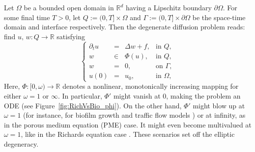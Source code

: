 \documentclass[review,11pt]{article}
\numberwithin{equation}{section}
\def \om {\omega}
\def \Om {\Omega}
\def \p  {\partial}
\def \R  {{\mathbb{R}}}
\begin{document}
Let $\Om$ be a bounded open domain in $\R^{d}$ having a Lipschitz boundary $\p\Om$. For some final time $T>0$, let $Q:=(0,T]\times\Omega$ and $\Gamma:=(0,T]\times \p\Om$ be the space-time domain and interface respectively. Then the degenerate diffusion problem reads: find $u,\,w:Q\to \R$ satisfying
\begin{equation}\label{eq:parabolic_equation}
\left\{ \begin{array}{rcll}
\partial_t u &=& \Delta w + f, & \text{in } Q, \\
w &\in& \Phi(u), & \text{in } Q, \\
w &=& 0, & \text{on } \Gamma, \\
u(0) &=& u_0, & \text{in } \Omega,
\end{array}
\right.
\end{equation}
Here, $\Phi:[0,\omega)\to \R$ denotes a nonlinear, monotonically increasing mapping for either $\omega=1$ or $\infty$. In particular, $\Phi' $ might vanish at $0$, making the problem an ODE (see Figure~\ref{fig:RichVsBio_phi}). On the other hand, $\Phi'$ might blow up at $\om=1$ (for instance, for biofilm growth \cite{van2002mathematical} and traffic flow models \cite{berthelin2008model}) or at infinity, as in the porous medium equation (PME) case. It might even become multivalued at $\om=1$, like in the Richards equation case \cite{mitra2024posteriori}. These scenarios set off the elliptic degeneracy.
\end{document}
